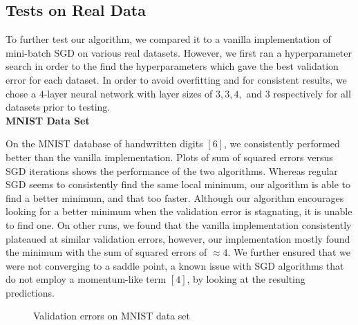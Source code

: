 \documentclass{article}
\begin{document}
\subsection{Tests on Real Data}
To further test our algorithm, we compared it to a vanilla implementation of mini-batch SGD on various real datasets. However, we first ran a hyperparameter search in order to the find the hyperparameters which gave the best validation error for each dataset. In order to avoid overfitting and for consistent results, we chose a $ 4 $-layer neural network with layer sizes of $ 3, 3, 4, $ and $ 3 $ respectively for all datasets prior to testing.
\\

\textbf{MNIST Data Set}
\par On the MNIST database of handwritten digits $ [6] $, 
we consistently performed better than the vanilla implementation. Plots of sum of squared errors versus SGD iterations shows the performance of the two algorithms. Whereas regular SGD seems to consistently find the same local minimum, our algorithm is able to find a better minimum, and that too faster. Although our algorithm encourages looking for a better minimum when the validation error is stagnating, it is unable to find one. On other runs, we found that the vanilla implementation consistently plateaued at similar validation errors, however, our implementation mostly found the minimum with the sum of squared errors of $ \approx 4 $. We further ensured that we were not converging to a saddle point, a known issue with SGD algorithms that do not employ a momentum-like term $ [4] $, by looking at the resulting predictions.
\begin{figure}[H]
	\centering
	\quad
	\caption{Validation errors on MNIST data set}%
	\label{MNIST}%
\end{figure}
\end{document}
